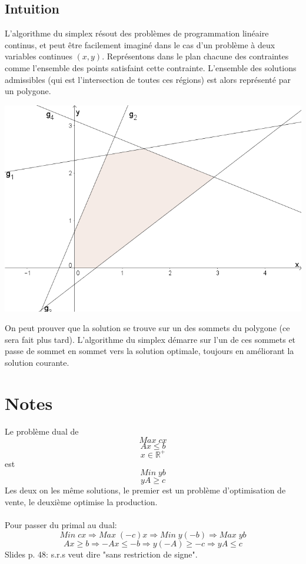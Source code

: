 \documentclass[a4paper]{report}
\begin{document}
\subsection{Intuition}
L'algorithme du simplex résout des problèmes de programmation linéaire continus,
et peut être facilement imaginé dans le cas d'un problème à deux variables
continues \((x,y)\). Représentons dans le plan chacune des contraintes comme
l'ensemble des points satisfaint cette contrainte. L'ensemble des solutions
admissibles (qui est l'intersection de toutes ces régions) est alors représenté
par un polygone.
\begin{center}\textbf{\textbf{}}
\includegraphics[width=\textwidth]{simplex-xy.png}
\end{center}
On peut prouver que la solution se trouve sur un des sommets du polygone (ce
sera fait plus tard). L'algorithme du simplex démarre sur l'un de ces sommets et
passe de sommet en sommet vers la solution optimale, toujours en améliorant la
solution courante.

\section{Notes}
Le problème dual de
\[Max\;cx\]
\[Ax\le b\]
\[x\in\mathbb{R}^+\]
est
\[Min\;yb\]
\[yA\ge c\]
Les deux on les même solutions, le premier est un problème d'optimisation de
vente, le deuxième optimise la production.
\paragraph{}
Pour passer du primal au dual:
\[Min\;cx\Rightarrow Max\;(-c)x\Rightarrow Min\;y(-b)\Rightarrow Max\;yb\]
\[Ax\ge b\Rightarrow -Ax\le -b\Rightarrow y(-A)\ge -c\Rightarrow yA\le c\]
Slides p. 48: s.r.s veut dire "sans restriction de signe".
\end{document}
